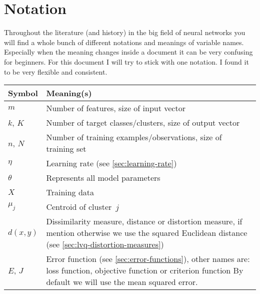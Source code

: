 \section{Notation}\label{sec:notation}
Throughout the literature (and history) in the big field of neural networks you will find a whole bunch of different notations and meanings of variable names. Especially when the meaning changes inside a document it can be very confusing for beginners. For this document I will try to stick with one notation. I found it to be very flexible and consistent.

\begin{tabularx}{\textwidth}{ l X }
Symbol			& Meaning(s) \\ \midrule
$m$				& Number of features, size of input vector \\
$k$, $K$		& Number of target classes/clusters, size of output vector \\
$n$, $N$		& Number of training examples/observations, size of training set \\
$\eta$			& Learning rate (see \ref{sec:learning-rate}) \\
$\theta$		& Represents all model parameters \\
$X$				& Training data \\

\midrule %
$\mu_j$			& Centroid of cluster~$j$ \\
$d(x, y)$		& Dissimilarity measure, distance or distortion measure, if mention otherwise we use the squared Euclidean distance (see \ref{sec:lvq-distortion-measures}) \\

$E$, $J$		& Error function (see \ref{sec:error-functions}), other names are: loss function, objective function or criterion function\newline
					By default we will use the mean squared error. \\


\end{tabularx}
